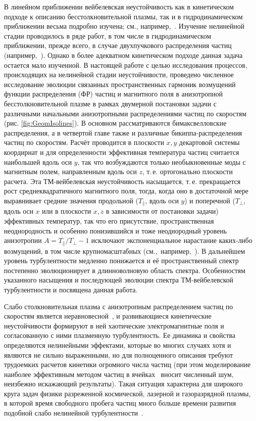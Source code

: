 В линейном приближении вейбелевская неустойчивость как в кинетическом подходе к описанию бесстолкновительной плазмы, так и в гидродинамическом приближении весьма подробно изучена; см., например,~\cite{Kocharovsky2016}. Изучение нелинейной стадии проводилось в ряде работ, в том числе в гидродинамическом приближении, прежде всего, в случае двухпучкового распределения частиц (например,~\cite{Romanov2004,Bychenkov2003}). Однако в более адекватном кинетическом подходе данная задача остается мало изученной. В настоящей работе с целью исследования процессов, происходящих на нелинейной стадии неустойчивости, проведено численное исследование эволюции связанных пространственных гармоник возмущений функции распределения (ФР) частиц и магнитного поля в анизотропной бесстолкновительной плазме в рамках двумерной постановки задачи с различными начальными анизотропными распределениями частиц по скоростям (рис. \ref{fig:GeomIsolines}). В основном рассматриваются бимаксвелловские распределения, а в четвертой главе также и различные бикиппа-распределения частиц по скоростям. Расчёт проводится в плоскости $x,y$ декартовой системы коордирнат и для определенности эффективная температура частиц считается наибольшей вдоль оси $y$, так что возбуждаются только необыкновенные моды с магнитным полем, направленным вдоль оси $z$, т.\,е. ортогонально плоскости расчета. Эта ТМ-вейбелевская неустойчивость насыщается, т.\,е. прекращается рост среднеквадратичного магнитного поля, тогда, когда оно в достаточной мере выравнивает средние значения продольной ($T_{\|}$, вдоль оси $y$) и поперечной ($T_\perp $, вдоль оси $x$ или в плоскости $x,z$ в зависимости от постановки задачи) эффективных температур, так что его присутствие, пространственная неоднородность и особенно понизившийся и тоже неоднородный уровень анизотропии $A={T_{\|}}/{T_{\perp}}-1$ исключают экспоненциальное нарастание каких-либо возмущений, в том числе крупномасштабных (см.,~например,~\cite{Borodachev2016_Radiofiz}). В дальнейшем уровень турбулентности медленно понижается и её пространственный спектр постепенно эволюционирует в длинноволновую область спектра. Особенностям указанного насыщения и последующей эволюции спектра ТМ-вейбелевской турбулентности и посвящена данная работа.

Слабо столкновительная плазма с анизотропным распределением частиц по скоростям является неравновесной~\cite{Mikhailovsky1971,Krall1975}, и развивающиеся кинетические неустойчивости формируют в ней хаотические электромагнитные поля и согласованную с ними плазменную турбулентность. Ее динамика и свойства определяются нелинейными эффектами, которые во многих случаях хотя и являются не сильно выраженными, но для полноценного описания требуют трудоемких расчетов кинетики огромного числа частиц (при этом моделирование наиболее эффективным методом частиц в ячейках~\cite{Kato2005,Borodachev2010,Ruyer2015,Lazar2022,Borodachev2016_Radiofiz,Romanov2004} вносит численный шум, неизбежно искажающий результаты). Такая ситуация характерна для широкого круга задач физики разреженной космической, лазерной и газоразрядной плазмы, в которой время свободного пробега частиц много больше времени развития подобной слабо нелинейной турбулентности~\cite{Baumjohann2012,Treumann2009,Marcowith2016,Gary1993}. 

